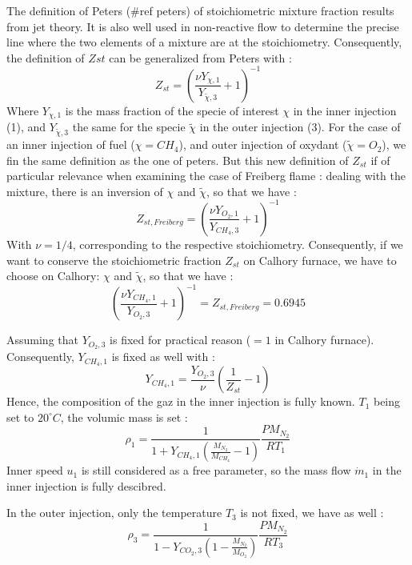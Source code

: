 The definition of Peters (\#ref peters) of stoichiometric mixture fraction results from jet theory. It is also well used in non-reactive flow to determine the precise line where the two elements of a mixture are at the stoichiometry. Consequently, the definition of $Zst$ can be generalized from Peters with :
\begin{equation}
Z_{st}=(\frac{\nu Y_{\chi,1}}{Y_{\tilde{\chi},3}}+1)^{-1}
\end{equation}
Where $Y_{\chi,1}$ is the mass fraction of the specie of interest $\chi$ in the inner injection (1), and $Y_{\tilde{\chi},3}$ the same for the specie $\tilde{\chi}$ in the outer injection (3). For the case of an inner injection of fuel ($\chi=CH_{4}$), and outer injection of oxydant ($\tilde{\chi}=O_{2}$), we fin the same definition as the one of peters. But this new definition of $Z_{st}$ if of particular relevance when examining the case of Freiberg flame : dealing with the mixture, there is an inversion of $\chi$ and $\tilde{\chi}$, so that we have :
\begin{equation}
Z_{st, Freiberg}=(\frac{\nu Y_{O_{2},1}}{Y_{CH_{4},3}}+1)^{-1}
\end{equation}
With $\nu=1/4$, corresponding to the respective stoichiometry. 
Consequently, if we want to conserve the stoichiometric fraction $Z_{st}$ on Calhory furnace, we have to choose on Calhory:
$\chi$ and $\tilde{\chi}$, so that we have :
\begin{equation}
(\frac{\nu Y_{CH_{4},1}}{Y_{O_{2},3}}+1)^{-1}=Z_{st, Freiberg}=0.6945
\end{equation}

Assuming that $Y_{O_{2},3}$ is fixed for practical reason ($=1$ in Calhory furnace). Consequently, $Y_{CH_{4},1}$ is fixed as well with :
\begin{equation}\label{eq:Zst_conservation}
Y_{CH_{4},1}=\frac{Y_{O_{2},3}}{\nu} (\frac{1}{Z_{st}}-1)
\end{equation}
Hence, the composition of the gaz in the inner injection is fully known. $T_{1}$ being set to $20^\circ C$, the volumic mass is set :
\begin{equation}
\rho_{1}=\frac{1}{1+Y_{CH_{4},1} (\frac{M_{N_{2}}}{M_{CH_{4}}}-1)} 
\frac{P M_{N_{2}}}{R T_{1}} 
\end{equation}
Inner speed $u_{1}$ is still considered as a free parameter, so the mass flow $\dot{m}_{1}$ in the inner injection is fully descibred.

In the outer injection, only the temperature $T_{3}$ is not fixed, we have as well :
\begin{equation}
\rho_{3}=\frac{1}{1-Y_{CO_{2},3} (1-\frac{M_{N_{2}}}{M_{O_{2}}})} 
\frac{P M_{N_{2}}}{R T_{3}} 
\end{equation}

